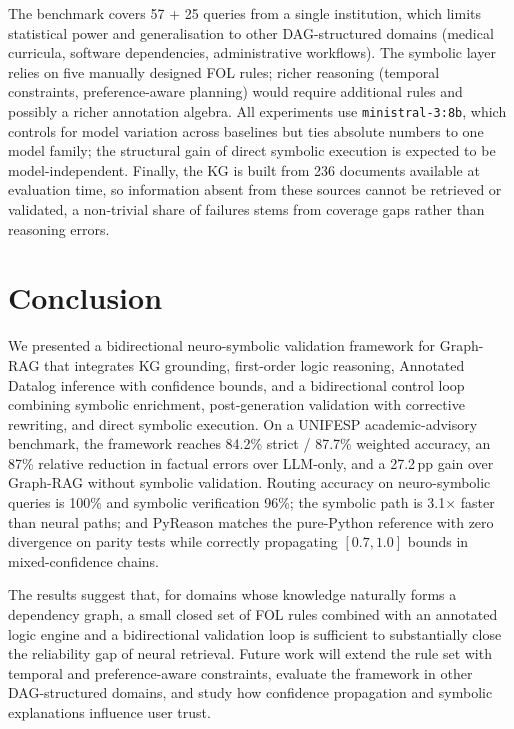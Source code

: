 \documentclass[runningheads]{llncs}
\begin{document}
The benchmark covers 57 + 25 queries from a single institution, which limits statistical power and generalisation to other DAG-structured domains (medical curricula, software dependencies, administrative workflows). The symbolic layer relies on five manually designed FOL rules; richer reasoning (temporal constraints, preference-aware planning) would require additional rules and possibly a richer annotation algebra. All experiments use \texttt{ministral-3:8b}, which controls for model variation across baselines but ties absolute numbers to one model family; the structural gain of direct symbolic execution is expected to be model-independent. Finally, the KG is built from 236 documents available at evaluation time, so information absent from these sources cannot be retrieved or validated, a non-trivial share of failures stems from coverage gaps rather than reasoning errors.


\section{Conclusion}

We presented a bidirectional neuro-symbolic validation framework for Graph-RAG that integrates KG grounding, first-order logic reasoning, Annotated Datalog inference with confidence bounds, and a bidirectional control loop combining symbolic enrichment, post-generation validation with corrective rewriting, and direct symbolic execution. On a UNIFESP academic-advisory benchmark, the framework reaches 84.2\% strict / 87.7\% weighted accuracy, an 87\% relative reduction in factual errors over LLM-only, and a 27.2\,pp gain over Graph-RAG without symbolic validation. Routing accuracy on neuro-symbolic queries is 100\% and symbolic verification 96\%; the symbolic path is 3.1$\times$ faster than neural paths; and PyReason matches the pure-Python reference with zero divergence on parity tests while correctly propagating $[0.7,1.0]$ bounds in mixed-confidence chains.

The results suggest that, for domains whose knowledge naturally forms a dependency graph, a small closed set of FOL rules combined with an annotated logic engine and a bidirectional validation loop is sufficient to substantially close the reliability gap of neural retrieval. Future work will extend the rule set with temporal and preference-aware constraints, evaluate the framework in other DAG-structured domains, and study how confidence propagation and symbolic explanations influence user trust.
\end{document}
